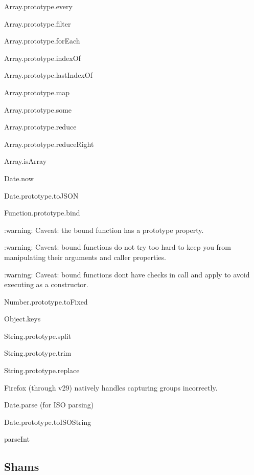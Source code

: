 \begin{DoxyItemize}
\item Array.\+prototype.\+every
\item Array.\+prototype.\+filter
\item Array.\+prototype.\+for\+Each
\item Array.\+prototype.\+index\+Of
\item Array.\+prototype.\+last\+Index\+Of
\item Array.\+prototype.\+map
\item Array.\+prototype.\+some
\item Array.\+prototype.\+reduce
\item Array.\+prototype.\+reduce\+Right
\item Array.\+is\+Array
\item Date.\+now
\item Date.\+prototype.\+to\+J\+S\+O\+N
\item Function.\+prototype.\+bind
\begin{DoxyItemize}
\item \+:warning\+: Caveat\+: the bound function has a prototype property.
\item \+:warning\+: Caveat\+: bound functions do not try too hard to keep you from manipulating their {\ttfamily arguments} and {\ttfamily caller} properties.
\item \+:warning\+: Caveat\+: bound functions don\textquotesingle{}t have checks in {\ttfamily call} and {\ttfamily apply} to avoid executing as a constructor.
\end{DoxyItemize}
\item Number.\+prototype.\+to\+Fixed
\item Object.\+keys
\item String.\+prototype.\+split
\item String.\+prototype.\+trim
\item String.\+prototype.\+replace
\begin{DoxyItemize}
\item Firefox (through v29) natively handles capturing groups incorrectly.
\end{DoxyItemize}
\item Date.\+parse (for I\+S\+O parsing)
\item Date.\+prototype.\+to\+I\+S\+O\+String
\item parse\+Int
\end{DoxyItemize}

\subsection*{Shams}


